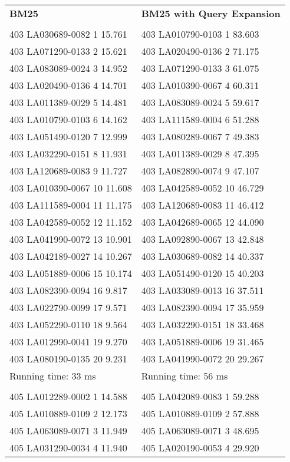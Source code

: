 \begin{tabular}{ l l }
\textbf{BM25} & \textbf{BM25 with Query Expansion}\\\\
403 LA030689-0082 1 15.761 & 403 LA010790-0103 1 83.603\\
403 LA071290-0133 2 15.621 & 403 LA020490-0136 2 71.175\\
403 LA083089-0024 3 14.952 & 403 LA071290-0133 3 61.075\\
403 LA020490-0136 4 14.701 & 403 LA010390-0067 4 60.311\\
403 LA011389-0029 5 14.481 & 403 LA083089-0024 5 59.617\\
403 LA010790-0103 6 14.162 & 403 LA111589-0004 6 51.288\\
403 LA051490-0120 7 12.999 & 403 LA080289-0067 7 49.383\\
403 LA032290-0151 8 11.931 & 403 LA011389-0029 8 47.395\\
403 LA120689-0083 9 11.727 & 403 LA082890-0074 9 47.107\\
403 LA010390-0067 10 11.608 & 403 LA042589-0052 10 46.729\\
403 LA111589-0004 11 11.175 & 403 LA120689-0083 11 46.412\\
403 LA042589-0052 12 11.152 & 403 LA042689-0065 12 44.090\\
403 LA041990-0072 13 10.901 & 403 LA092890-0067 13 42.848\\
403 LA042189-0027 14 10.267 & 403 LA030689-0082 14 40.337\\
403 LA051889-0006 15 10.174 & 403 LA051490-0120 15 40.203\\
403 LA082390-0094 16 9.817 & 403 LA033089-0013 16 37.511\\
403 LA022790-0099 17 9.571 & 403 LA082390-0094 17 35.959\\
403 LA052290-0110 18 9.564 & 403 LA032290-0151 18 33.468\\
403 LA012990-0041 19 9.270 & 403 LA051889-0006 19 31.465\\
403 LA080190-0135 20 9.231 & 403 LA041990-0072 20 29.267\\
Running time: 33 ms & Running time: 56 ms\\
\\
405 LA012289-0002 1 14.588 & 405 LA042089-0083 1 59.288\\
405 LA010889-0109 2 12.173 & 405 LA010889-0109 2 57.888\\
405 LA063089-0071 3 11.949 & 405 LA063089-0071 3 48.695\\
405 LA031290-0034 4 11.940 & 405 LA020190-0053 4 29.920\\

\end{tabular}

